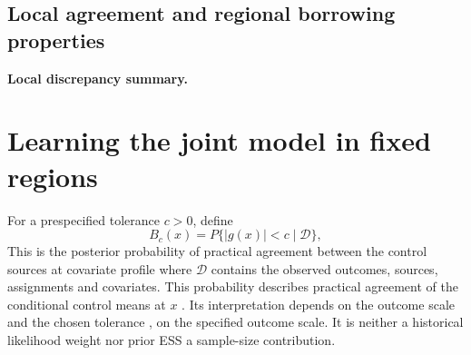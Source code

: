 \documentclass[11pt]{article}
\theoremstyle{remark}\newtheorem{remark}{Remark}[section]
\providecommand{\DIFaddtex}[1]{{\protect\color{blue} \sf #1}} %
\providecommand{\DIFdeltex}[1]{{\protect\color{red} \scriptsize #1}} %
\providecommand{\DIFaddbegin}{} %
\providecommand{\DIFaddend}{} %
\providecommand{\DIFdelbegin}{} %
\providecommand{\DIFdelend}{} %
\providecommand{\DIFadd}[1]{\texorpdfstring{\DIFaddtex{#1}}{#1}} %
\providecommand{\DIFdel}[1]{\texorpdfstring{\DIFdeltex{#1}}{}} %
\begin{document}
\DIFdelbegin \subsection{\DIFdel{Local agreement and regional borrowing properties}}
\addtocounter{subsection}{-1}%
\DIFdel{\textbf{Local discrepancy summary.}
}\DIFdelend \DIFaddbegin \section{\DIFadd{Learning the joint model in fixed regions}}\label{sec:theory}
\DIFaddend For a prespecified tolerance $c>0$, define
\DIFdelbegin %
\DIFdelend \DIFaddbegin \begin{equation}\label{eq:local}
B_c(x)=P\{|g(x)|<c\mid\mathcal D\},
\end{equation}\DIFaddend 
\DIFdelbegin \DIFdel{This is the posterior probability of practical agreement between the control sources at covariate profile }\DIFdelend \DIFaddbegin \DIFadd{where $\mathcal D$ contains the observed outcomes, sources, assignments and covariates. This probability describes practical agreement of the conditional control means at }\DIFaddend $x$\DIFdelbegin \DIFdel{. Its interpretation depends on the outcome scale and the chosen tolerance}\DIFdelend \DIFaddbegin \DIFadd{, on the specified outcome scale}\DIFaddend . It is neither a \DIFaddbegin \DIFadd{historical }\DIFaddend likelihood weight nor \DIFdelbegin \DIFdel{prior ESS}\DIFdelend \DIFaddbegin \DIFadd{a sample-size contribution}\DIFaddend .
\end{document}
